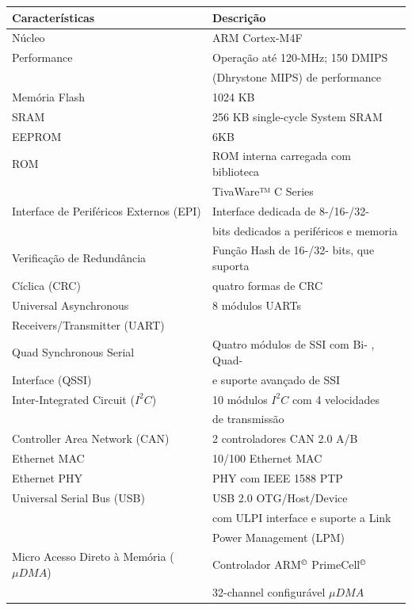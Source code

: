\begin{longtable}{|l|l|}
	\hline
	\cellcolor[HTML]{343434} \color[HTML]{FFFFFF} Características & \cellcolor[HTML]{343434} \color[HTML]{FFFFFF} Descrição \\
	\hline
	Núcleo & ARM Cortex-M4F\\
	\hline
	Performance & Operação até 120-MHz; 150 DMIPS \\
	& (Dhrystone MIPS) de performance \\
	\hline
	Memória Flash & 1024 KB  \\
	\hline
	SRAM & 256 KB single-cycle System SRAM \\
	\hline
	EEPROM & 6KB  \\
	\hline
	ROM & ROM interna carregada com biblioteca  \\
	 & TivaWare™  C Series \\
	\hline
	Interface de Periféricos Externos (EPI)  & Interface dedicada de 8-/16-/32-   \\ 
	 &  bits dedicados a periféricos e memoria\\
	\hline
	 Verificação de Redundância & Função Hash de 16-/32- bits,  que suporta  \\
	  Cíclica (CRC)   & quatro formas de CRC \\
	\hline
	Universal Asynchronous  & 8 módulos UARTs \\
	Receivers/Transmitter (UART) & \\
	\hline
	Quad Synchronous Serial & Quatro módulos de SSI com Bi- , Quad-\\
	Interface (QSSI) &  e suporte avançado de SSI\\
	\hline
	Inter-Integrated Circuit ($I^{2}C$) & 10 módulos $I^{2}C$ com 4 velocidades \\
	 & de transmissão\\
	\hline
	Controller Area Network (CAN) & 2 controladores CAN 2.0 A/B \\
	\hline
	Ethernet MAC & 10/100 Ethernet MAC \\
	\hline
	Ethernet PHY & PHY com IEEE 1588 PTP \\
	\hline
	Universal Serial Bus (USB) & USB 2.0 OTG/Host/Device  \\ 
	& com ULPI interface e suporte a Link   \\
	& Power Management (LPM) \\
	\hline
	Micro Acesso Direto à Memória ($\mu DMA$) & Controlador ARM$^\copyright$ PrimeCell$^\copyright$  \\
	& 32-channel configurável  $\mu DMA$ \\

\end{longtable}
